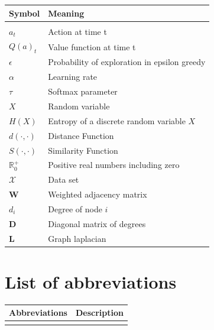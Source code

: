 \documentclass[12pt,a4paper,bibliography=totocnumbered,listof=totocnumbered]{scrartcl}
\begin{document}
\begin{tabular}{p{6cm}p{9cm}}
\textbf{Symbol} 		& 		\textbf{Meaning} \\
\midrule
\vspace{0.3cm} & \vspace{0.3cm} 			\\
$a_t$				  & Action at time t			\\
$Q(a)_t$	& Value function at time t \\
$\epsilon$			& Probability of exploration in epsilon greedy \\
$\alpha$ & Learning rate \\ 
$\tau$ & Softmax parameter \\
$X$ & Random variable \\
$H(X) $ &  Entropy of a  discrete random variable $X$ \\ 
$d(\cdot,\cdot)$ & Distance Function \\
$S(\cdot,\cdot)$ & Similarity Function \\
$ \mathbb{R}_0^+$ & Positive real numbers including zero \\
$\mathcal{X}$ & Data set \\ 
\textbf{W} & Weighted adjacency matrix \\
$d_i$ & Degree of node $i$ \\
\textbf{D} & Diagonal matrix of degrees \\
\textbf{L} & Graph laplacian \\
\end{tabular}

\pagebreak


\section{List of abbreviations}

\begin{tabular}{p{6cm}p{9cm}}
\textbf{Abbreviations} & \textbf{Description} 										\\
\midrule
\vspace{0.3cm} & \vspace{0.3cm} 														\\ 
\end{tabular}
\end{document}
